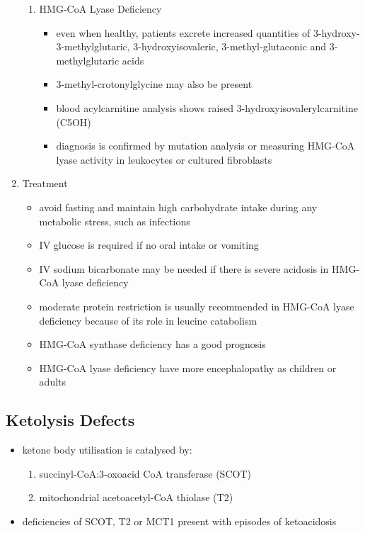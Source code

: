 \documentclass{scrartcl}
\begin{document}
\begin{enumerate}
\begin{enumerate}
\item HMG-CoA Lyase Deficiency
\label{sec:orgf5224c8}
\begin{itemize}
\item even when healthy, patients excrete increased quantities of
3-hydroxy-3-methylglutaric, 3-hydroxyisovaleric, 3-methyl-glutaconic
and 3-methylglutaric acids
\item 3-methyl-crotonylglycine may also be present
\item blood acylcarnitine analysis shows raised
3-hydroxyisovalerylcarnitine (C5OH)
\item diagnosis is confirmed by mutation analysis or measuring HMG-CoA
lyase activity in leukocytes or cultured fibroblasts
\end{itemize}
\end{enumerate}

\item Treatment
\label{sec:orgd8d3eb8}
\begin{itemize}
\item avoid fasting and maintain  high carbohydrate intake during any
metabolic stress, such as infections
\item IV glucose is required if no oral intake or vomiting
\item IV sodium bicarbonate may be needed if there is severe acidosis in
HMG-CoA lyase deficiency
\item moderate protein restriction is usually recommended in HMG-CoA
lyase deficiency because of its role in leucine catabolism
\item HMG-CoA synthase deficiency has a good prognosis
\item HMG-CoA lyase deficiency have more encephalopathy as children or adults
\end{itemize}
\end{enumerate}

\subsection{Ketolysis Defects}
\label{sec:org4679964}
\begin{itemize}
\item ketone body utilisation is catalysed by:
\begin{enumerate}
\item succinyl-CoA:3-oxoacid CoA transferase (SCOT)
\item mitochondrial acetoacetyl-CoA thiolase (T2)
\end{enumerate}
\item deficiencies of SCOT, T2 or MCT1 present with episodes of ketoacidosis
\end{itemize}
\end{document}
